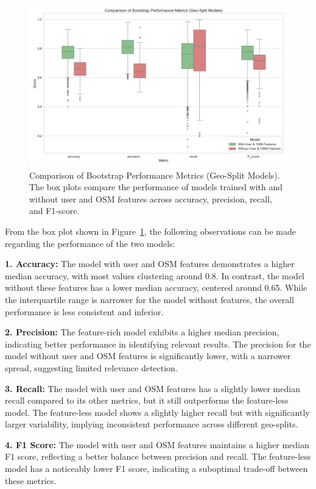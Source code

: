 \documentclass[
    13pt, %
    a4paper, %
    listof=totoc, %
    bibliography=totoc, %
    index=totoc, %
    headsepline
]{scrreprt}
\begin{document}
\begin{figure}[H]
    \centering
    \includegraphics[width=\textwidth]{geo_boot_strap_comparison.png}
    \caption{Comparison of Bootstrap Performance Metrics (Geo-Split Models). The box plots compare the performance of models trained with and without user and OSM features across accuracy, precision, recall, and F1-score.}
    \label{fig:geo_bootstrap_comparison}
\end{figure}

From the box plot shown in Figure~\ref{fig:geo_bootstrap_comparison}, the following observations can be made regarding the performance of the two models:

\textbf{1. Accuracy:} The model with user and OSM features demonstrates a higher median accuracy, with most values clustering around 0.8. In contrast, the model without these features has a lower median accuracy, centered around 0.65. While the interquartile range is narrower for the model without features, the overall performance is less consistent and inferior.

\textbf{2. Precision:} The feature-rich model exhibits a higher median precision, indicating better performance in identifying relevant results. The precision for the model without user and OSM features is significantly lower, with a narrower spread, suggesting limited relevance detection.

\textbf{3. Recall:} The model with user and OSM features has a slightly lower median recall compared to its other metrics, but it still outperforms the feature-less model. The feature-less model shows a slightly higher recall but with significantly larger variability, implying inconsistent performance across different geo-splits.

\textbf{4. F1 Score:} The model with user and OSM features maintains a higher median F1 score, reflecting a better balance between precision and recall. The feature-less model has a noticeably lower F1 score, indicating a suboptimal trade-off between these metrics.
\end{document}
